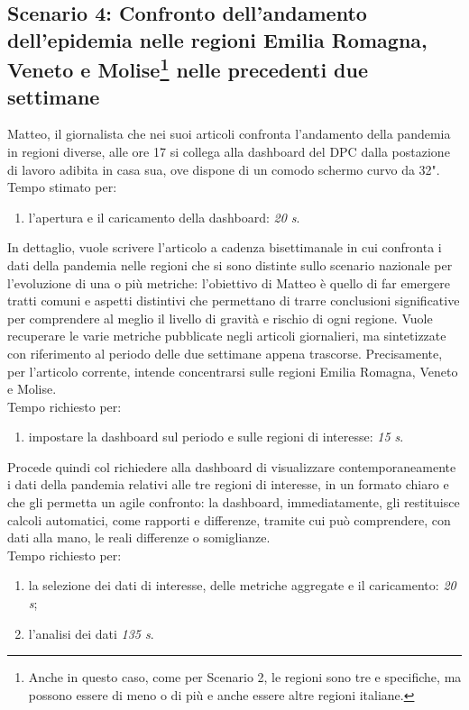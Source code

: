 \subsection[Scenario 4: Confronto dell'andamento dell'epidemia nelle regioni Emilia Romagna, Veneto e Molise nelle precedenti due settimane]{Scenario 4: Confronto dell'andamento dell'epidemia nelle regioni Emilia Romagna, Veneto e Molise\footnote{Anche in questo caso, come per Scenario 2, le regioni sono tre e specifiche, ma possono essere di meno o di più e anche essere altre regioni italiane.} nelle precedenti due settimane}
Matteo, il giornalista che nei suoi articoli confronta l'andamento della pandemia in regioni diverse, alle ore 17 si collega alla dashboard del DPC dalla postazione di lavoro adibita in casa sua, ove dispone di un comodo schermo curvo da 32".\\
Tempo stimato per:
\begin{enumerate}
    \item l'apertura e il caricamento della dashboard: \textit{20 s}.
\end{enumerate}

\noindent
In dettaglio, vuole scrivere l'articolo a cadenza bisettimanale in cui confronta i dati della pandemia nelle  regioni che si sono distinte sullo scenario nazionale per l'evoluzione di una o più metriche: l'obiettivo di Matteo è quello di far emergere tratti comuni e aspetti distintivi che permettano di trarre conclusioni significative per comprendere al meglio il livello di gravità e rischio di ogni regione.
\noindent
Vuole recuperare le varie metriche pubblicate negli articoli giornalieri, ma sintetizzate con riferimento al periodo delle due settimane appena trascorse.
Precisamente, per l'articolo corrente, intende concentrarsi sulle regioni Emilia Romagna, Veneto e Molise.\\
Tempo richiesto per:
\begin{enumerate}
    \item impostare la dashboard sul periodo e sulle regioni di interesse: \textit{15 s}.
\end{enumerate}

\noindent
Procede quindi col richiedere alla dashboard di visualizzare contemporaneamente i dati della pandemia relativi alle tre regioni di interesse, in un formato chiaro e che gli permetta un agile confronto: la dashboard, immediatamente, gli restituisce calcoli automatici, come rapporti e differenze, tramite cui può comprendere, con dati alla mano, le reali differenze o somiglianze.\\
Tempo richiesto per:
\begin{enumerate}
    \item la selezione dei dati di interesse, delle metriche aggregate e il caricamento: \textit{20 s};
    \item l'analisi dei dati \textit{135 s}.
\end{enumerate}

